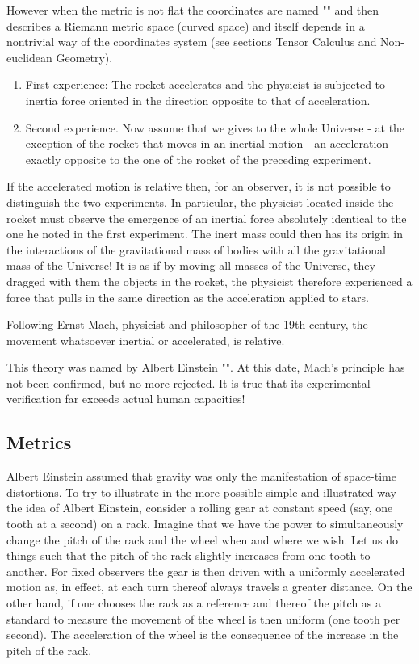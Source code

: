 	
	However when the metric is not flat the coordinates are named "" and then describes a Riemann metric space (curved space) and itself depends in a nontrivial way of the coordinates system (see sections Tensor Calculus and Non-euclidean Geometry).
	
	\begin{enumerate}
		\item First experience: The rocket accelerates and the physicist is subjected to inertia force oriented in the direction opposite to that of acceleration.
		
		\item Second experience. Now assume that we gives to the whole Universe - at the exception of the rocket that moves in an inertial motion - an acceleration exactly opposite to the one of the rocket of the preceding experiment.
	\end{enumerate}
	If the accelerated motion is relative then, for an observer, it is not possible to distinguish the two experiments. In particular, the physicist located inside the rocket must observe the emergence of an inertial force absolutely identical to the one he noted in the first experiment. The inert mass could then has its origin in the interactions of the gravitational mass of bodies with all the gravitational mass of the Universe! It is as if by moving all masses of the Universe, they dragged with them the objects in the rocket, the physicist therefore experienced a force that pulls in the same direction as the acceleration applied to stars.
	
	Following Ernst Mach, physicist and philosopher of the 19th century, the movement whatsoever inertial or accelerated, is relative.
	
	This theory was named by Albert Einstein "". At this date, Mach's principle has not been confirmed, but no more rejected. It is true that its experimental verification far exceeds actual human capacities!
	
	\subsection{Metrics}
	Albert Einstein assumed that gravity was only the manifestation of space-time distortions. To try to illustrate in the more possible simple and illustrated way the idea of Albert Einstein, consider a rolling gear at constant speed (say, one tooth at a second) on a rack. Imagine that we have the power to simultaneously change the pitch of the rack and the wheel when and where we wish. Let us do things such that the pitch of the rack slightly increases from one tooth to another. For fixed observers the gear is then driven with a uniformly accelerated motion as, in effect, at each turn thereof always travels a greater distance. On the other hand, if one chooses the rack as a reference and thereof the pitch as a standard to measure the movement of the wheel is then uniform (one tooth per second). The acceleration of the wheel is the consequence of the increase in the pitch of the rack.
	
